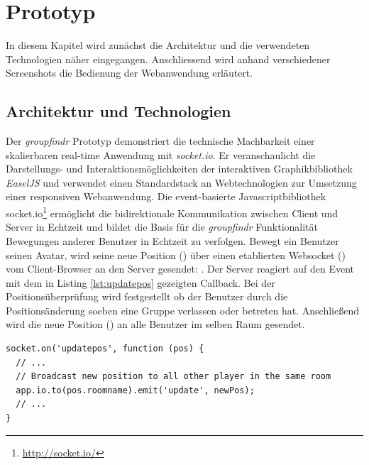 \chapter{Prototyp}
\label{prototyp}

In diesem Kapitel wird zunächst die Architektur und die verwendeten Technologien näher eingegangen. Anschliessend wird anhand verschiedener Screenshots die Bedienung der Webanwendung erläutert.

\section{Architektur und Technologien}
\label{architektur_technologie}

Der \emph{groupfindr} Prototyp demonstriert die technische Machbarkeit einer skalierbaren real-time Anwendung mit \emph{socket.io}. Er veranschaulicht die Darstellungs- und Interaktionsmöglichkeiten der interaktiven Graphikbibliothek \emph{EaselJS} und verwendet einen Standardstack an Webtechnologien zur Umsetzung einer responsiven Webanwendung.
\newline\newline
Die event-basierte Javascriptbibliothek socket.io\footnote{\url{http://socket.io/}} ermöglicht die bidirektionale Kommunikation zwischen Client und Server in Echtzeit und bildet die Basis für die \emph{groupfindr} Funktionalität Bewegungen anderer Benutzer in Echtzeit zu verfolgen. Bewegt ein Benutzer seinen Avatar, wird seine neue Position () über einen etablierten Websocket () vom Client-Browser an den Server gesendet: . Der Server reagiert auf den  Event mit dem in Listing \ref{lst:updatepos} gezeigten Callback. Bei der Positionsüberprüfung wird festgestellt ob der Benutzer durch die Positionsänderung soeben eine Gruppe verlassen oder betreten hat. Anschließend wird die neue Position () an alle Benutzer im selben Raum gesendet.

\begin{lstlisting}[caption=Server Implementation des \emph{updatepos} Event, label=lst:updatepos]
socket.on('updatepos', function (pos) { 
  // ... 
  // Broadcast new position to all other player in the same room 
  app.io.to(pos.roomname).emit('update', newPos); 
  // ... 
}
\end{lstlisting}

